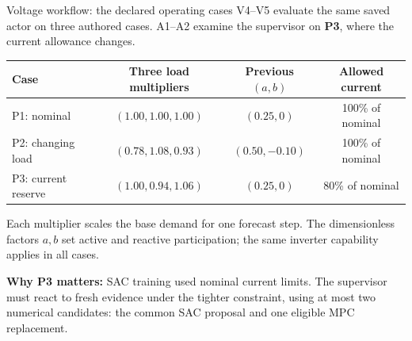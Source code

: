 
\begin{frame}[t]{Voltage workflow: the declared operating cases}
\deepdive
\small
V4--V5 evaluate the same saved actor on three authored cases. A1--A2 examine the supervisor on \textbf{P3}, where the current allowance changes.
\par\medskip
\begin{tabular}{@{}lccc@{}}
\toprule Case & Three load multipliers & Previous $(a,b)$ & Allowed current \\
\midrule
P1: nominal & $(1.00,1.00,1.00)$ & $(0.25,0)$ & 100\% of nominal \\
P2: changing load & $(0.78,1.08,0.93)$ & $(0.50,-0.10)$ & 100\% of nominal \\
P3: current reserve & $(1.00,0.94,1.06)$ & $(0.25,0)$ & 80\% of nominal \\
\bottomrule
\end{tabular}
\par\medskip
Each multiplier scales the base demand for one forecast step. The dimensionless factors $a,b$ set active and reactive participation; the same inverter capability applies in all cases.
\par\medskip
\textbf{Why P3 matters:} SAC training used nominal current limits. The supervisor must react to fresh evidence under the tighter constraint, using at most two numerical candidates: the common SAC proposal and one eligible MPC replacement.
\end{frame}



